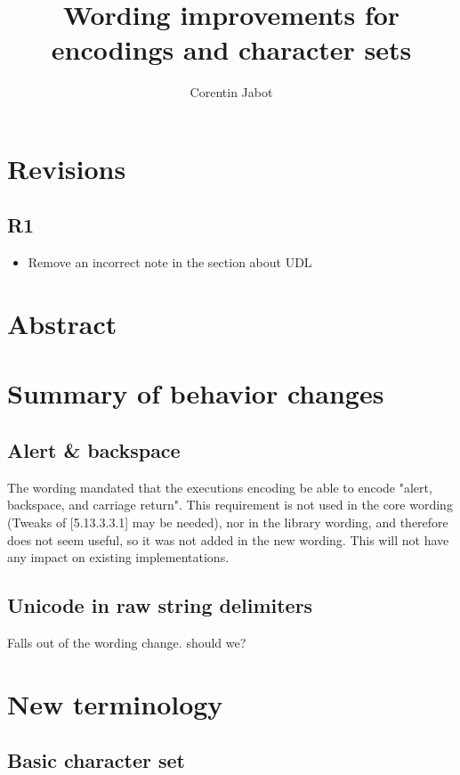 \documentclass{wg21}
\title{Wording improvements for encodings and character sets}
\author{Corentin Jabot}{corentin.jabot@gmail.com}
\begin{document}
\maketitle

\section{Revisions}

\subsection{R1}
\begin{itemize}
\item Remove an incorrect note in the section about UDL
\end{itemize}


\section{Abstract}


\section{Summary of behavior changes}


\subsection{Alert \& backspace} %

The wording mandated that the executions encoding be able to encode "alert, backspace, and carriage return". This requirement is not used
in the core wording (Tweaks of [5.13.3.3.1] may be needed), nor in the library wording, and therefore does not seem useful, so it was not added in the new wording.
This will not have any impact on existing implementations.

\subsection{Unicode in raw string delimiters}

Falls out of the wording change. should we?

\section{New terminology}

\subsection{Basic character set}
\end{document}
